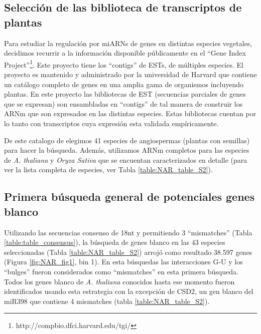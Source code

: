 \subsection{Selección de las biblioteca de transcriptos de plantas}

Para estudiar la regulación por miARNs de genes en distintas especies vegetales, decidimos recurrir a la información disponible públicamente en el ``Gene Index Project''\footnote{http://compbio.dfci.harvard.edu/tgi/}.
Este proyecto tiene los ``contigs'' de ESTs, de múltiples especies.
El proyecto es mantenido y administrado por la universidad de Harvard que contiene un catálogo completo de genes en una amplia gama de organismos incluyendo plantas.
En este proyecto las bibliotecas de EST (secuencias parciales de genes que se expresan) son ensambladas en ``contigs'' de tal manera de construir los ARNm que son expresados en las distintas especies.
Estas bibliotecas cuentan por lo tanto con transcriptos cuya expresión esta validada empíricamente.

De este catalogo de elegimos 41 especies de angiospermas (plantas con semillas) para hacer la búsqueda.
Además, utilizamos ARNm completos para las especies de \textit{A. thaliana} y \textit{Oryza Sativa}  que se encuentan caracterizados en detalle (para ver la lista completa de especies, ver Tabla \ref{table:NAR_table_S2}).

\subsection{Primera búsqueda general de potenciales genes blanco}
Utilizando las secuencias consenso de 18nt y permitiendo 3 ``mismatches'' (Tabla \ref{table:table_consensus}), la búsqueda de genes blanco en las 43 especies seleccionadas (Tabla \ref{table:NAR_table_S2}) arrojó como resultado 38.597 genes (Figura \ref{fig:NAR_fig1}, bin 1).
En esta búsquedas las interacciones G-U y los ``bulges'' fueron considerados como ``mismatches'' en esta primera búsqueda.
Todos los genes blanco de  \textit{A. thaliana} conocidos hasta ese momento fueron identificados usando esta estrategia con la excepción de CSD2, un gen blanco del miR398 que contiene 4 mismatches (tabla \ref{table:NAR_table_S2}).


